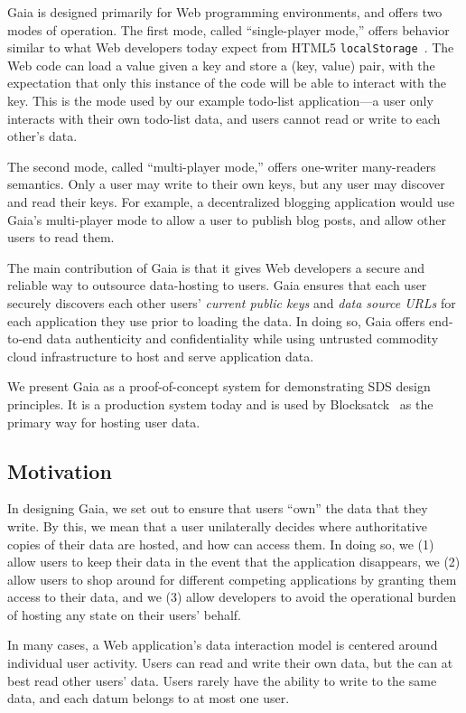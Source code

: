 Gaia is designed primarily for Web programming environments, and offers two
modes of operation.  The first mode, called ``single-player mode,'' offers
behavior similar to what Web developers today expect from HTML5
\texttt{localStorage}~\cite{w3c-localstorage}.  The Web code can load a value
given a key and store a (key, value) pair, with the expectation that only this
instance of the code will be able to interact with the key.  This is the mode
used by our example todo-list application---a user only interacts with their own
todo-list data, and users cannot read or write to each other's data.

The second mode, called ``multi-player mode,'' offers one-writer many-readers
semantics.  Only a user may write to their own keys, but any user may discover
and read their keys.  For example, a decentralized blogging application would
use Gaia's multi-player mode to allow a user to publish blog posts, and allow
other users to read them.

The main contribution of Gaia is that it gives Web developers a secure and
reliable way to outsource data-hosting to users.  Gaia ensures that each user
securely discovers each other users' \emph{current public keys} and \emph{data
source URLs} for each application they use prior to loading the data.
In doing so, Gaia offers end-to-end
data authenticity and confidentiality while using untrusted commodity cloud infrastructure
to host and serve application data.

We present Gaia as a proof-of-concept system for demonstrating SDS design
principles.  It is a production system today and is used by
Blocksatck~\cite{applications} as the primary way for hosting user data.

\subsection{Motivation}

In designing Gaia, we set out to ensure that users ``own'' the data that they
write.  By this, we mean that a user unilaterally decides where authoritative
copies of their data are hosted, and how can access them.  In doing so, we 
(1) allow users to keep their data in the event that the application disappears, we
(2) allow users to shop around for different competing applications by granting them
access to their data, and we (3) allow developers to avoid the operational burden of
hosting any state on their users' behalf.

In many cases, a Web application's data interaction model is centered around
individual user activity.  Users can read and write their own data, but the can
at best read other users' data.  Users rarely have the ability to write to the
same data, and each datum belongs to at most one user.


